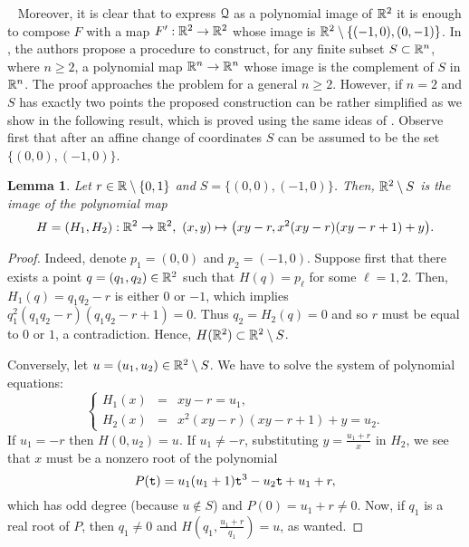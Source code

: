 \documentclass[11pt,a4paper]{amsart}
\newtheorem{lem}[theor]{Lemma}
\theoremstyle{definition}
\theoremstyle{remark}
\newenvironment{steps}[1]{%
\refstepcounter{theor}\noindent{\bf (\thetheor)\ {#1}}\ }%
{\em}
\newcommand{\Qq}{{\EuScript Q}}
\begin{document}
\begin{steps}{The ``old''map.}
Moreover, it is clear that to express $\Qq$ as a polynomial image of ${\mathbb R}^2$ it is enough to compose $F$ with a map $F':{\mathbb R}^2\to{\mathbb R}^2$ whose image is ${\mathbb R}^2\setminus\{(-1,0),(0,-1)\}$. In \cite[\S2]{fg1}, the authors propose a procedure to construct, for any finite subset $S\subset{\mathbb R}^n$, where $n\geq2$, a polynomial map ${\mathbb R}^n\to{\mathbb R}^n$ whose image is the complement of $S$ in ${\mathbb R}^n$. The proof approaches the problem for a general $n\geq2$. However, if $n=2$ and $S$ has exactly two points the proposed construction can be rather simplified as we show in the following result, which is proved using the same ideas of \cite[2.1]{fg1}. Observe first that after an affine change of coordinates $S$ can be assumed to be the set $\{(0,0),(-1,0)\}$.
\end{steps}

\begin{lem}\label{2pt}
Let $r\in{\mathbb R}\setminus\{0,1\}$ and $S=\{(0,0),(-1,0)\}$. Then, ${\mathbb R}^2\setminus S$ is the image of the polynomial map 
$$
H=(H_1,H_2):\R^2\to\R^2,\ (x,y)\mapsto\big(xy-r,x^2(xy-r)(xy-r+1)+y\big).
$$ 
\end{lem}
\begin{proof}
Indeed, denote $p_1=(0,0)$ and $p_2=(-1,0)$. Suppose first that there exists a point $q=(q_1,q_2)\in{\mathbb R}^2$ such that $H(q)=p_\ell$ for some $\ell=1,2$. Then, $H_1(q)=q_1q_2-r$ is either $0$ or $-1$, which implies $q_1^2(q_1q_2-r)(q_1q_2-r+1)=0$. Thus $q_2=H_2(q)=0$ and so $r$ must be equal to $0$ or $1$, a contradiction. Hence, $H({\mathbb R}^2)\subset{\mathbb R}^2\setminus S$. 

Conversely, let $u=(u_1,u_2)\in{\mathbb R}^2\setminus S$. We have to solve the system of polynomial equations:
$$
\left\{\begin{array}{rcl}
H_1(x)&=&xy-r=u_1,\\[4pt]
H_2(x)&=&x^2(xy-r)(xy-r+1)+y=u_2.
\end{array}\right.
$$
If $u_1=-r$ then $H(0,u_2)=u$. If $u_1\neq-r$, substituting $y=\frac{u_1+r}{x}$ in $H_2$, we see that $x$ must be a nonzero root of the polynomial
$$
P({\tt t})=u_1(u_1+1){\tt t}^3-u_2{\tt t}+u_1+r,
$$
which has odd degree (because $u\not\in S$) and $P(0)=u_1+r\neq 0$. Now, if $q_1$ is a real root of $P$, then $q_1\neq0$ and $H(q_1,\frac{u_1+r}{q_1})=u$, as wanted.
\end{proof}
\end{document}
